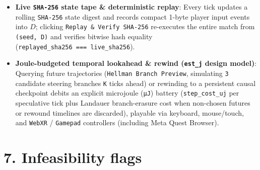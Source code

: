 \documentclass[10pt,letterpaper]{article}
\providecommand{\tightlist}{\setlength{\itemsep}{1pt}\setlength{\parskip}{0pt}}
\begin{document}
\begin{itemize}
\tightlist
\item
  \textbf{Live \texttt{SHA-256} state tape \& deterministic replay}:
  Every tick updates a rolling \texttt{SHA-256} state digest and records
  compact 1-byte player input events into \(D\); clicking
  \texttt{Replay\ \&\ Verify\ SHA-\allowbreak{}256} re-executes the entire match from
  \texttt{(\allowbreak{}seed,\allowbreak{}\ D)} and verifies bitwise hash equality
  (\texttt{replayed\_\allowbreak{}sha256\ ===\ live\_\allowbreak{}sha256}).
\item
  \textbf{Joule-budgeted temporal lookahead \& rewind (\texttt{est\_j}
  design model)}: Querying future trajectories
  (\texttt{Hellman\ Branch\ Preview}, simulating \texttt{3} candidate
  steering branches \texttt{K} ticks ahead) or rewinding to a persistent
  causal checkpoint debits an explicit microjoule (\texttt{µJ}) battery
  (\texttt{step\_\allowbreak{}cost\_\allowbreak{}uj} per speculative tick plus Landauer
  branch-erasure cost when non-chosen futures or rewound timelines are
  discarded), playable via keyboard, mouse/touch, and \texttt{WebXR} /
  \texttt{Gamepad} controllers (including Meta Quest Browser).
\end{itemize}

\section{7. Infeasibility flags}\label{infeasibility-flags}
\end{document}
